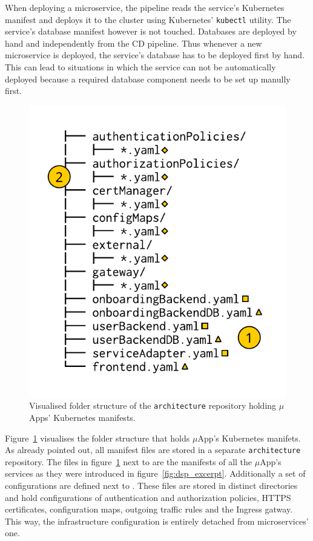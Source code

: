 When deploying a microservice, the pipeline reads the service's Kubernetes
manifest and deploys it to the cluster using Kubernetes' \texttt{kubectl}
utility. The service's database manifest however is not touched. Databases are
deployed by hand and independently from the \ac{CD} pipeline. Thus whenever a
new microservice is deployed, the service's database has to be deployed first
by hand. This can lead to situations in which the service can not be
automatically deployed because a required database component needs to be set up
manully first.

\begin{figure}[H]
\begin{center}
  \includegraphics[scale=0.8]{images/figures/manifests_folder_naive.pdf}
\end{center}
\caption{Visualised folder structure of the \texttt{architecture} repository
holding $\mu$Apps' Kubernetes manifests.}%
\label{fig:manifests_folder_naive}
\end{figure}


Figure~\ref{fig:manifests_folder_naive} visualises the folder structure that
holds $\mu$App's Kubernetes manifets. As already pointed out, all manifest
files are stored in a separate \texttt{architecture} repository. The files in
figure~\ref{fig:manifests_folder_naive} next to  are the manifests
of all the $\mu$App's services as they were introduced in
figure~\ref{fig:dsp_excerpt}. Additionally a set of configurations are defined
next to . These files are stored in distinct directories and hold
configurations of authentication and authorization policies, \ac{HTTPS}
certificates, configuration maps, outgoing traffic rules and the Ingress
gatway. This way, the infrastructure configuration is entirely detached from
microservices' one.

